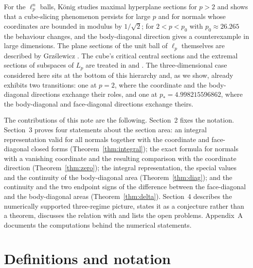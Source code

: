 \documentclass[11pt]{article}
\theoremstyle{plain}
\numberwithin{theorem}{section}
\begin{document}
For the $\ell_p^n$ balls, K\"onig \cite{konig} studies maximal hyperplane sections for $p>2$ and shows that a cube-slicing phenomenon persists for large $p$ and for normals whose coordinates are bounded in modulus by $1/\sqrt2$; for $2<p<p_0$ with $p_0\approx26.265$ the behaviour changes, and the body-diagonal direction gives a counterexample in large dimensions. The plane sections of the unit ball of $\ell_p$ themselves are described by Grz\'slewicz \cite{grzaslewicz}. The cube's critical central sections and the extremal sections of subspaces of $L_p$ are treated in \cite{ambrus} and \cite{eskenazis}. The three-dimensional case considered here sits at the bottom of this hierarchy and, as we show, already exhibits two transitions: one at $p=2$, where the coordinate and the body-diagonal directions exchange their roles, and one at $p_*=4.998215596862$, where the body-diagonal and face-diagonal directions exchange theirs.

The contributions of this note are the following. Section~2 fixes the notation. Section~3 proves four statements about the section area: an integral representation valid for all normals together with the coordinate and face-diagonal closed forms (Theorem~\ref{thm:integral}); the exact formula for normals with a vanishing coordinate and the resulting comparison with the coordinate direction (Theorem~\ref{thm:zero}); the integral representation, the special values and the continuity of the body-diagonal area (Theorem~\ref{thm:diag}); and the continuity and the two endpoint signs of the difference between the face-diagonal and the body-diagonal areas (Theorem~\ref{thm:delta}). Section~4 describes the numerically supported three-regime picture, states it as a conjecture rather than a theorem, discusses the relation with \cite{ball,konig,grzaslewicz,ambrus,eskenazis} and lists the open problems. Appendix~A documents the computations behind the numerical statements.

\section{Definitions and notation}
\end{document}
